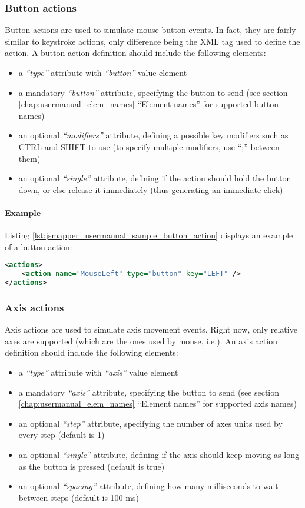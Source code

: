 \subsubsection{Button actions}
Button actions are used to simulate mouse button events. In fact, they are fairly similar to keystroke actions, only difference being the XML tag used to define the action. 
A button action definition should include the following elements:
\begin{itemize}
	\item a \emph{``type''} attribute with \emph{``button''} value element
	\item a mandatory \emph{``button''} attribute, specifying the button to send (see section \ref{chap:usermanual_elem_names} ``Element names'' for supported button names)
	\item an optional \emph{``modifiers''} attribute, defining a possible key modifiers such as CTRL and SHIFT to use (to specify multiple modifiers, use ``;'' between them)
	\item an optional \emph{``single''} attribute, defining if the action should hold the button down, or else release it immediately (thus generating an immediate click)
\end{itemize}

\paragraph{Example}
Listing \ref{lst:jsmapper_usermanual_sample_button_action} displays an example of a button action: 
\begin{lstlisting}[language=XML,caption={Sample button action},label={lst:jsmapper_usermanual_sample_button_action}]
<actions>
	<action name="MouseLeft" type="button" key="LEFT" />
</actions>  
\end{lstlisting}


\subsubsection{Axis actions}
Axis actions are used to simulate axis movement events. Right now, only relative axes are supported (which are the ones used by mouse, i.e.). 
An axis action definition should include the following elements:
\begin{itemize}
	\item a \emph{``type''} attribute with \emph{``axis''} value element
	\item a mandatory \emph{``axis''} attribute, specifying the button to send (see section \ref{chap:usermanual_elem_names} ``Element names'' for supported axis names)
	\item an optional \emph{``step''} attribute, specifying the number of axes units used by every step (default is 1)
	\item an optional \emph{``single''} attribute, defining if the axis should keep moving as long as the button is pressed (default is true)
	\item an optional \emph{``spacing''} attribute, defining how many milliseconds to wait between steps (default is 100 ms)
\end{itemize}

